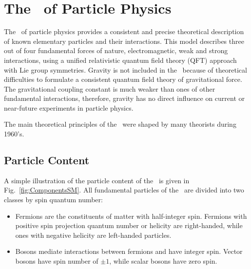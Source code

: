 \section{The \sm\ of Particle Physics}
The \sm\ of particle physics provides a consistent and precise theoretical description of known elementary particles and their interactions.
This model describes three out of four fundamental forces of nature, electromagnetic, weak and strong interactions, using a unified relativistic quantum field theory (QFT) approach with Lie group symmetries.
Gravity is not included in the \sm\ because of theoretical difficulties to formulate a consistent quantum field theory of gravitational force. 
The gravitational coupling constant is much weaker than ones of other fundamental interactions, therefore, gravity has no direct influence on current or near-future experiments in particle physics.

The main theoretical principles of the \sm\ were shaped by many theorists during 1960's. 



\subsection{Particle Content}
\label{sec:ParticleComposition_SM}
A simple illustration of the particle content of the \sm\  is given in Fig.~\ref{fig:ComponentsSM}.
All fundamental particles of the \sm\ are divided into two classes by spin quantum number: %

\begin{itemize}
\item Fermions are the constituents of matter with half-integer spin. Fermions with positive spin projection quantum number or helicity are right-handed, while ones with negative helicity are left-handed particles. 
\item Bosons mediate interactions between fermions and have integer spin. Vector bosons have spin number of $\pm 1$, while scalar bosons have zero spin. 
\end{itemize}

